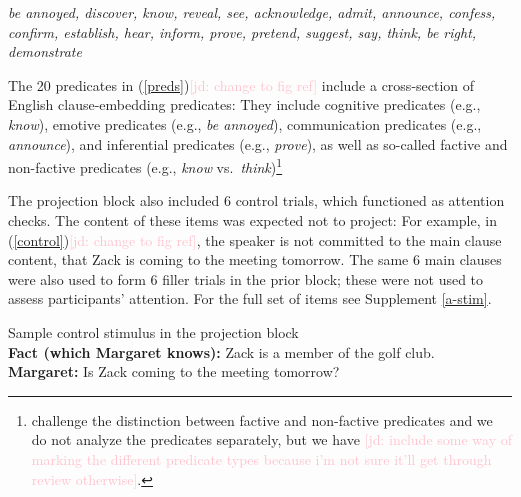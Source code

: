 \documentclass[11pt,fleqn]{article}
\newcommand{\jd}[1]{\textcolor{Pink}{[jd: #1]}}
\newcommand{\6}{\mbox{$[\hspace*{-.6mm}[$}}
\newcommand{\9}{\mbox{$]\hspace*{-.6mm}]$}}
\begin{document}
\begin{exe}
\ex\label{preds} %

{\em be annoyed, discover, know, reveal, see, acknowledge, admit, announce, confess, confirm, establish, hear, inform, prove, pretend, suggest, say, think, be right, demonstrate}
\end{exe}
The 20 predicates in (\ref{preds})\jd{change to fig ref} include a cross-section of English clause-embedding predicates: They include cognitive predicates (e.g., {\em know}), emotive predicates (e.g., {\em be annoyed}), communication predicates (e.g., {\em announce}), and inferential predicates (e.g., {\em prove}), as well as so-called factive and non-factive predicates (e.g., {\em know} vs.\ {\em think})\footnote{ challenge the distinction between factive and non-factive predicates and we do not analyze the predicates separately, but we have \jd{include some way of marking the different predicate types because i'm not sure it'll get through review otherwise}.}

The projection block also included 6 control trials, which functioned as attention checks. The content of these items was expected not to project: For example, in (\ref{control})\jd{change to fig ref}, the speaker is not committed to the main clause content, that Zack is coming to the meeting tomorrow. %
The same 6 main clauses were also used to form 6 filler trials in the prior block; these were not used to assess participants' attention. For the full set of items see Supplement \ref{a-stim}.

\begin{exe}
\ex\label{control} Sample control stimulus in the projection block \\ {\bf Fact (which Margaret knows):}  Zack is a member of the golf club. \\ {\bf Margaret:} Is Zack coming to the meeting tomorrow?
\end{exe}

\end{document}
